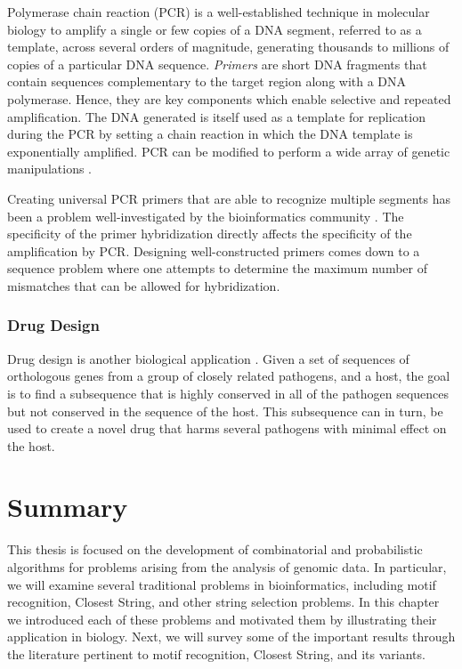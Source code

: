 Polymerase chain reaction (PCR) is a well-established technique in molecular biology to amplify a single or few copies of a DNA segment, referred to as a template, across several orders of magnitude, generating thousands to millions of copies of a particular DNA sequence. {\em Primers} are short DNA fragments that contain sequences complementary to the target region along with a DNA polymerase. Hence, they are key components which enable selective and repeated amplification. The DNA generated is itself used as a template for replication during the PCR by setting a chain reaction in which the DNA template is exponentially amplified. PCR can be modified to perform a wide array of genetic manipulations \cite{PH}. 

Creating universal PCR primers that are able to recognize multiple segments has been a problem well-investigated by the bioinformatics community \cite{DRSS,HMM,LLMWZ00,LBOT,PH}. The specificity of the primer hybridization directly affects the specificity of the amplification by PCR.  Designing well-constructed primers comes down to a sequence problem where one attempts to determine the maximum number of mismatches that can be allowed for hybridization.

\subsubsection{Drug Design}

Drug design is another biological application \cite{crooke,DLLM,LLMWZ00}.  Given a set of sequences of orthologous genes from a group of closely related pathogens, and a host, the goal is to find a subsequence that is highly conserved in all of the pathogen sequences but not conserved in the sequence of the host. This subsequence can in turn, be used to create a novel drug that harms several pathogens with minimal effect on the host.  


\section{Summary}

This thesis is focused on the development of combinatorial and probabilistic algorithms for problems arising from the analysis of genomic data. In particular, we will examine several traditional problems in bioinformatics, including motif recognition, {\sc Closest String}, and other string selection problems.  In this chapter we introduced each of these problems and motivated them by illustrating their application in biology.  Next, we will survey some of the important results through the literature pertinent to motif recognition, {\sc Closest String}, and its variants. 

